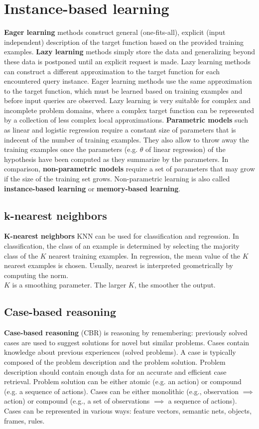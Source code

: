 \documentclass{report}
\begin{document}
\section{Instance-based learning}
{\bf Eager learning} methods construct general (one-fits-all), explicit (input independent) description of the target function based on the provided training examples.
{\bf Lazy learning} methods simply store the data and generalizing beyond these data is postponed until an explicit request is made.
Lazy learning methods can construct a different approximation to the target function for each encountered query instance. Eager learning methods use the same approximation to the target function, which must be learned based on training examples and before input queries are observed.
Lazy learning is very suitable for complex and incomplete problem domains, where a complex target function can be represented by a collection of less complex local approximations.
{\bf Parametric models} such as linear and logistic regression require a constant size of parameters that is indecent of the number of training examples. They also allow to throw away the training examples once the parameters (e.g. $\theta$ of linear regression) of the hypothesis have been computed as they summarize by the parameters. In comparison, {\bf non-parametric models} require a set of parameters that may grow if the size of the training set grows. Non-parametric learning is also called {\bf instance-based learning} or {\bf memory-based learning}.

\subsection{k-nearest neighbors}
{\bf K-nearest neighbors} KNN can be used for classification and regression. In classification, the class of an example is determined by selecting the majority class of the $K$ nearest training examples. In regression, the mean value of the $K$ nearest examples is chosen. Usually, nearest is interpreted geometrically by computing the norm.
\\
$K$ is a smoothing parameter. The larger $K$, the smoother the output.

\subsection{Case-based reasoning}
{\bf Case-based reasoning} (CBR) is reasoning by remembering: previously solved cases are used to suggest solutions for novel but similar problems. Cases contain knowledge about previous experiences (solved problems).
A case is typically composed of the problem description and the problem solution. Problem description should contain enough data for an accurate and efficient case retrieval.
Problem solution can be either atomic (e.g. an action) or compound (e.g. a sequence of actions). Cases can be either monolithic (e.g., observation $\implies$ action) or compound (e.g., a set of observations $\implies$ a sequence of actions).
Cases can be represented in various ways: feature vectors, semantic nets, objects, frames, rules.
\end{document}
